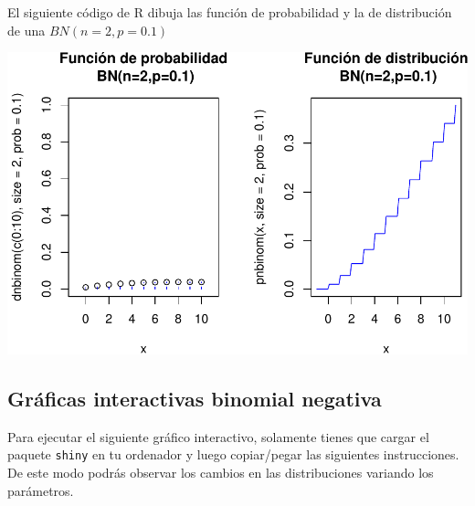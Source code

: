 \documentclass[]{book}
\begin{document}
El siguiente código de R dibuja las función de probabilidad y la de distribución de una \(BN(n=2,p=0.1)\)

\begin{center}\includegraphics{curso-probabilidad-udemy_files/figure-latex/unnamed-chunk-50-1} \end{center}

\hypertarget{gruxe1ficas-interactivas-binomial-negativa}{%
\subsection{Gráficas interactivas binomial negativa}\label{gruxe1ficas-interactivas-binomial-negativa}}

Para ejecutar el siguiente gráfico interactivo, solamente tienes que cargar el paquete \texttt{shiny} en tu ordenador y luego copiar/pegar las siguientes instrucciones. De este modo podrás observar los cambios en las distribuciones variando los parámetros.
\end{document}
